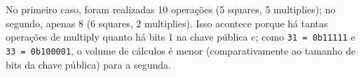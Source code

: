 \documentclass{article}
\begin{document}
No primeiro caso, foram realizadas 10 operações (5 squares, 5 multiplies); no segundo, apenas 8 (6 squares, 2 multiplies). Isso acontece porque há tantas operações de multiply quanto há bits 1 na chave pública $e$; como \texttt{31 = 0b11111} e \texttt{33 = 0b100001}, o volume de cálculos é menor (comparativamente ao tamanho de bits da chave pública) para a segunda.
\end{document}
